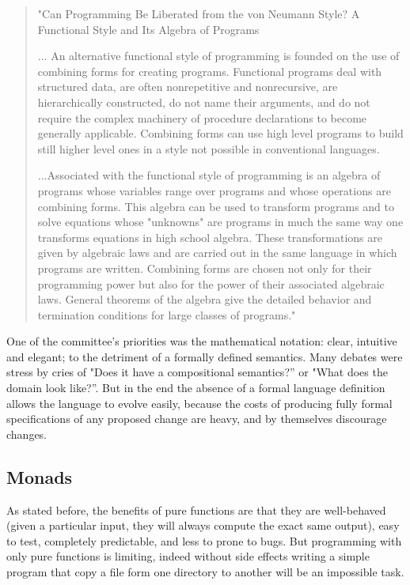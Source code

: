\documentclass[target=mst,babel=\babelopt]{thud}[2014/01/17]
\begin{document}
\begin{quote}
"Can Programming Be Liberated from the von 
Neumann Style? A Functional Style and Its 
Algebra of Programs


... An alternative functional style of programming is 
founded on the use of combining forms for creating 
programs. Functional programs deal with structured 
data, are often nonrepetitive and nonrecursive, are hierarchically constructed, do not name their arguments, and 
do not require the complex machinery of procedure 
declarations to become generally applicable. Combining 
forms can use high level programs to build still higher 
level ones in a style not possible in conventional languages.

...Associated with the functional style of programming 
is an algebra of programs whose variables range over 
programs and whose operations are combining forms. 
This algebra can be used to transform programs and to 
solve equations whose "unknowns" are programs in much 
the same way one transforms equations in high school 
algebra. These transformations are given by algebraic 
laws and are carried out in the same language in which 
programs are written. Combining forms are chosen not 
only for their programming power but also for the power 
of their associated algebraic laws. General theorems of 
the algebra give the detailed behavior and termination 
conditions for large classes of programs." \cite{Backus:1978:CPL}

\end{quote}

One of the committee's priorities was the mathematical notation: clear, intuitive
and elegant; to the detriment of a formally defined semantics. Many
debates were stress by cries of "Does it have a compositional
semantics?'' or "What does the domain look like?''.
But in the end the absence of a formal language definition allows the
language to evolve easily, because the costs of
producing fully formal specifications of any proposed change are
heavy, and by themselves discourage changes.

\subsection{Monads}
As stated before, the benefits of pure functions are that they are
well-behaved (given a particular input, they will always compute the
exact same output), easy to test, completely predictable, and less to
prone to bugs. But programming with only pure functions is
limiting, indeed without side effects writing a simple program that
copy a file form one directory to another will be an impossible task.
\end{document}
